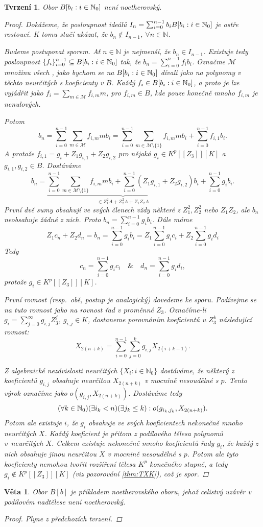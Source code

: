 \documentclass[11pt,a4paper]{article}
\newcommand\m[1]{\mathbb { #1 }} %
\newcommand\p[1]{\mathcal{ #1 }} %
\newcommand\N{\m N}
\newcommand*{\ml}[1]{\[\textstyle\let\displaystyle\textstyle#1\]}	%
\newcommand*{\mld}[1]{\[#1\]} %
\newcounter{numb}
\theoremstyle{definition}
\theoremstyle{plain}
\newtheorem{veta}[numb]{Věta}
\newtheorem{tvrzeni}[numb]{Tvrzení}
\begin{document}
\begin{tvrzeni}
	Obor $\Ball$ není noetherovský.
	
	\begin{proof}
		\newcommand*{\I}{_{i = 0}^{n - 1}}

		Dokážeme, že posloupnost ideálů $I_n = \sum\I b_i \Ball$ je ostře rostoucí. K tomu stačí ukázat, že $b_n \notin I_{n - 1}$, $\forall n \in \N$.

		Budeme postupovat sporem. Ať $n \in \N$ je nejmenší, že $b_n \in I_{n - 1}$. Existuje tedy posloupnost $\{f_i\}\I \subseteq \Ball$ tak, že $b_n = \sum\I f_i b_i$. Označme $\p M$ množinu všech \uv{monických monočlenů v neurčitých $\{b_i: i \in \N_0\}$}, jako bychom se na $\Ball$ dívali jako na polynomy v těchto neurčitých s koeficienty v $B$. Každý $f_i \in \Ball$, a proto je lze vyjádřit jako $f_i = \sum_{m \in \p M} f_{i, m} m$, pro $f_{i, m} \in B$, kde pouze konečně mnoho $f_{i, m}$ je nenulových.

		Potom
		\mld{
			b_n = \sum\I \sum_{m \in \p M} f_{i, m} m b_i = \sum\I \sum_{m \in \p M \setminus \{1\}} f_{i, m} m b_i + \sum\I f_{i, 1} b_i.
		}
		A protože $f_{i, 1} = g_i + Z_1 g_{i, 1} + Z_2 g_{i, 2}$ pro nějaká $g_i \in K^p[[Z_3]][K]$ a $g_{i, 1}, g_{i, 2} \in B$. Dostáváme
		\mld{
			b_n = \underbrace{\sum\I \sum_{m \in \p M \setminus \{1\}} f_{i, m} m b_i + \sum\I \left(Z_1 g_{i, 1} + Z_2 g_{i, 2}\right)b_i}_{\in Z_1^2 A + Z_2^2 A + Z_1 Z_2 A} + \sum\I g_i b_i.
		}
		První dvě sumy obsahují ve svých členech vždy některé z $Z_1^2, Z_2^2$ nebo
		$Z_1 Z_2$, ale $b_n$ neobsahuje žádné z nich. Proto $b_n = \sum\I g_i b_i$. Dále máme
		\mld{
			Z_1 c_n + Z_2 d_n = b_n = \sum\I g_i b_i = Z_1 \sum\I g_i c_i + Z_2 \sum\I g_i d_i
		}
		Tedy
		\mld{
			c_n = \sum\I g_i c_i \quad \& \quad d_n = \sum\I g_i d_i,
		}
		protože $g_i \in K^p[[Z_3]][K]$.

		První rovnost (resp.\ obě, postup je analogický) dovedeme ke sporu. Podívejme se na tuto rovnost jako na rovnost řad v proměnné $Z_3$. Označíme-li $g_i = \sum_{j = 0}^\infty g_{i, j} Z_3^j$, $g_{i, j} \in K$, dostaneme porovnáním koeficientů u $Z_3^k$ následující rovnost:
		\mld{
			X_{2(n + k)} = \sum\I \sum_{j = 0}^k g_{i, j} X_{2(i + k - 1)}.
		}

		Z algebraické nezávislosti neurčitých $\{X_i: i \in \N_0\}$ dostáváme, že některý z koeficientů $g_{i, j}$ obsahuje neurčitou $X_{2(n + k)}$ v mocnině nesoudělné s $p$. Tento výrok označíme jako $o(g_{i, j}, X_{2(n + k)})$. Dostáváme tedy
		\ml{
			(\forall k \in \N_0) (\exists i_k < n) (\exists j_k \leq k): o(g_{i_k, j_k}, X_{2(n + k)}).
		}
		Potom ale existuje $i$, že $g_i$ obsahuje ve svých koeficientech nekonečně mnoho neurčitých $X$. Každý koeficient je přitom z podílového tělesa polynomů v~neurčitých $X$. Celkem existuje nekonečně mnoho koeficientů řady $g_i$, že každý z nich obsahuje jinou neurčitou $X$ v mocnině nesoudělné s $p$. Potom ale tyto koeficienty nemohou tvořit rozšíření tělesa $K^p$ konečného stupně, a tedy $g_i \notin K^p[[Z_3]][K]$ (viz pozorování \ref{thm:TXK}), což je spor.
	\end{proof}
\end{tvrzeni}

\begin{veta}
	Obor $B[b]$ je příkladem noetherovského oboru, jehož celistvý uzávěr v podílovém nadtělese není noetherovský.
	
	\begin{proof}
		Plyne z předchozích tvrzení.
	\end{proof}
\end{veta}
\end{document}
